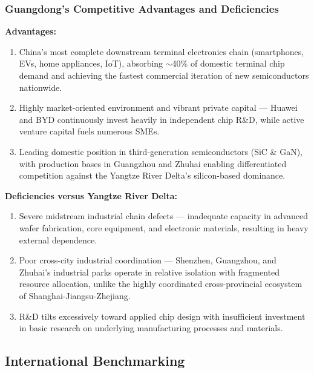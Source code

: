 \documentclass[12pt,a4paper]{article}
\begin{document}
\subsubsection{Guangdong's Competitive Advantages and Deficiencies}

\textbf{Advantages:}
\begin{enumerate}[label=(\arabic*)]
    \item China's most complete downstream terminal electronics chain
          (smartphones, EVs, home appliances, IoT), absorbing $\sim$40\%
          of domestic terminal chip demand and achieving the fastest
          commercial iteration of new semiconductors nationwide.
    \item Highly market-oriented environment and vibrant private capital
          — Huawei and BYD continuously invest heavily in independent
          chip R\&D, while active venture capital fuels numerous SMEs.
    \item Leading domestic position in third-generation semiconductors
          (SiC \& GaN), with production bases in Guangzhou and Zhuhai
          enabling differentiated competition against the Yangtze River
          Delta's silicon-based dominance.
\end{enumerate}

\textbf{Deficiencies versus Yangtze River Delta:}
\begin{enumerate}[label=(\arabic*)]
    \item Severe midstream industrial chain defects — inadequate capacity
          in advanced wafer fabrication, core equipment, and electronic
          materials, resulting in heavy external dependence.
    \item Poor cross-city industrial coordination — Shenzhen, Guangzhou,
          and Zhuhai's industrial parks operate in relative isolation
          with fragmented resource allocation, unlike the highly
          coordinated cross-provincial ecosystem of Shanghai-Jiangsu-Zhejiang.
    \item R\&D tilts excessively toward applied chip design with
          insufficient investment in basic research on underlying
          manufacturing processes and materials.
\end{enumerate}

\subsection{International Benchmarking}
\label{sec:international_comparison}
\end{document}
